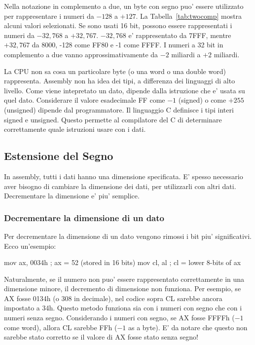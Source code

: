 Nella notazione in complemento a due, un byte con segno puo' essere
utilizzato per rappresentare i numeri da $-128$ a $+127$. La Tabella~\ref{tab:twocomp}
mostra alcuni valori selezionati. Se sono usati 16 bit, possono essere 
rappresentati i numeri da $-32,768$ a $+32,767$. $-32,768$ e' rappresentato 
da 7FFF, mentre $+32,767$ da 8000, -128 come FF80 e -1 come FFFF. 
I numeri a 32 bit in complemento a due vanno approssimativamente
da $-2$ miliardi a $+2$ miliardi.   


La CPU non sa cosa un particolare byte (o una word o una double word) 
rappresenta. Assembly non ha idea dei tipi, a differenza dei linguaggi
di alto livello. Come viene intepretato un dato, dipende dalla istruzione
che e' usata su quel dato. Considerare il valore esadecimale FF come  
$-1$ (signed) o come $+255$(unsigned) dipende dal programmatore.
Il linguaggio C definisce i tipi interi signed e unsigned. Questo 
permette al compilatore del C di determinare correttamente quale
istruzioni usare con i dati.  


\subsection{Estensione del Segno }

In assembly, tutti i dati hanno una dimensione specificata. E' spesso
necessario aver bisogno di cambiare la dimensione dei dati, per utilizzarli
con altri dati. Decrementare la dimensione e' piu' semplice. 

\subsubsection{Decrementare la dimensione di un dato}

Per decrementare la dimensione di un dato vengono rimossi i bit piu' 
significativi. Ecco un'esempio:
\begin{AsmCodeListing}[numbers=none,frame=none]
      mov    ax, 0034h      ; ax = 52 (stored in 16 bits)
      mov    cl, al         ; cl = lower 8-bits of ax
\end{AsmCodeListing}

Naturalmente, se il numero non puo' essere rappresentato correttamente
in una dimensione minore, il decremento di dimensione non funziona. Per
esempio, se {\code AX} fosse 0134h (o 308 in decimale), nel codice sopra
{\code CL} sarebbe ancora impostato a 34h. Questo metodo funziona sia 
con i numeri con segno che con i numeri senza segno. Considerando i
numeri con segno, se {\code AX} fosse FFFFh ($-1$ come word), allora
{\code CL} sarebbe FFh ($-1$ as a byte). E' da notare che questo
non sarebbe stato corretto se il valore di {\code AX} fosse stato senza
segno!

